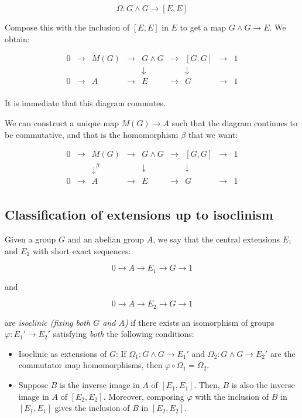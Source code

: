 \documentclass{ucetd}
\begin{document}
$$\Omega: G \wedge G \to [E,E]$$

Compose this with the inclusion of $[E,E]$ in $E$ to get a map $G
\wedge G \to E$. We obtain:

$$\begin{array}{ccccccccc}
0 & \to & M(G) & \to & G \wedge G & \to & [G,G] & \to & 1\\
 &&               && \downarrow     &&\downarrow&& \\
0 & \to & A & \to & E & \to & G & \to & 1\\
\end{array}$$

It is immediate that this diagram commutes.

We can construct a unique map $M(G) \to A$ such that the diagram
continues to be commutative, and that is the homomorphism $\beta$ that
we want:

$$\begin{array}{ccccccccc}
0 & \to & M(G) & \to & G \wedge G & \to & [G,G] & \to & 1\\
 &&   \downarrow^{\beta}  &&  \downarrow     && \downarrow&& \\
0 & \to & A &\to & E & \to & G & \to & 1\\
\end{array}$$

\subsection{Classification of extensions up to isoclinism}\label{sec:extensionsuptoisoclinism}

Given a group $G$ and an abelian group $A$, we say that the central
extensions $E_1$ and $E_2$ with short exact sequences:

$$0 \to A \to E_1 \to G \to 1$$

and

$$0 \to A \to E_2 \to G \to 1$$

are {\em isoclinic (fixing both $G$ and $A$)} if there exists an
isomorphism of groups $\varphi:E_1' \to E_2'$ satisfying {\em both}
the following conditions:

\begin{itemize}
\item Isoclinic as extensions of $G$: If $\Omega_1:G \wedge G \to
  E_1'$ and $\Omega_2:G \wedge G \to E_2'$ are the commutator map
  homomorphisms, then $\varphi \circ \Omega_1 = \Omega_2$.
\item Suppose $B$ is the inverse image in $A$ of $[E_1,E_1]$. Then,
  $B$ is also the inverse image in $A$ of $[E_2,E_2]$. Moreover,
  composing $\varphi$ with the inclusion of $B$ in $[E_1,E_1]$ gives
  the inclusion of $B$ in $[E_2,E_2]$.
\end{itemize}
\end{document}
